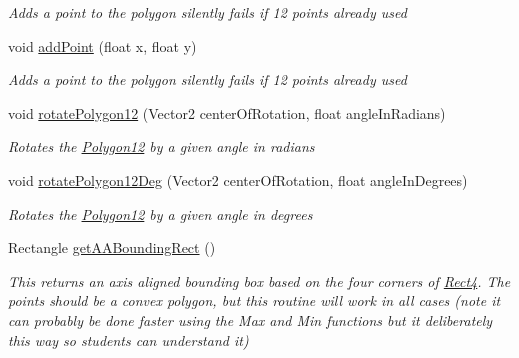 \begin{DoxyCompactItemize}
\begin{DoxyCompactList}\small\item\em Adds a point to the polygon silently fails if 12 points already used \end{DoxyCompactList}\item 
void \mbox{\hyperlink{class_r_c___framework_1_1_polygon12_a249a0044355228c11129a72691f1f9ce}{add\+Point}} (float x, float y)
\begin{DoxyCompactList}\small\item\em Adds a point to the polygon silently fails if 12 points already used \end{DoxyCompactList}\item 
void \mbox{\hyperlink{class_r_c___framework_1_1_polygon12_a652b0913ffee96a6c53e56d6e26aba45}{rotate\+Polygon12}} (Vector2 center\+Of\+Rotation, float angle\+In\+Radians)
\begin{DoxyCompactList}\small\item\em Rotates the \mbox{\hyperlink{class_r_c___framework_1_1_polygon12}{Polygon12}} by a given angle in radians \end{DoxyCompactList}\item 
void \mbox{\hyperlink{class_r_c___framework_1_1_polygon12_a41b3194bb88382ab68f1252b673548a5}{rotate\+Polygon12\+Deg}} (Vector2 center\+Of\+Rotation, float angle\+In\+Degrees)
\begin{DoxyCompactList}\small\item\em Rotates the \mbox{\hyperlink{class_r_c___framework_1_1_polygon12}{Polygon12}} by a given angle in degrees \end{DoxyCompactList}\item 
Rectangle \mbox{\hyperlink{class_r_c___framework_1_1_polygon12_ae0d2f0fb8ef452a5d8affebe08403f0c}{get\+A\+A\+Bounding\+Rect}} ()
\begin{DoxyCompactList}\small\item\em This returns an axis aligned bounding box based on the four corners of \mbox{\hyperlink{class_r_c___framework_1_1_rect4}{Rect4}}. The points should be a convex polygon, but this routine will work in all cases (note it can probably be done faster using the Max and Min functions but it deliberately this way so students can understand it) \end{DoxyCompactList}\end{DoxyCompactItemize}
